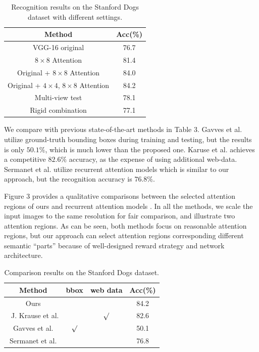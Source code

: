 \documentclass[10pt,twocolumn,letterpaper]{article}
\begin{document}
\begin{table}[htb]
\begin{center}
\begin{tabular}
{c|c}\hline
Method &   Acc(\%) \\\hline\hline
VGG-16 original  & 76.7 \\
$8\times8$ Attention  & 81.4 \\
Original + $8\times8$ Attention & 84.0 \\
Original + $4\times4$, $8\times8$ Attention & 84.2 \\
Multi-view test  & 78.1 \\
Rigid combination & 77.1 \\\hline
\end{tabular}
\caption{Recognition results on the Stanford Dogs dataset with different settings.}
\end{center}
\end{table}

We compare with previous state-of-the-art methods in Table 3.
Gavves et al. \cite{bd13} utilize ground-truth bounding boxes during training and testing, but the results is only $50.1\%$, which is much lower than the proposed one.
Karuse et al. \cite{bd21} achieves a competitive $82.6\%$ accuracy, as the expense of using additional web-data.
Sermanet et al. \cite{bd3} utilize recurrent attention models which is similar to our approach, but the recognition accuracy is $76.8\%$.

Figure 3 provides a qualitative comparisons between the selected attention regions of ours and recurrent attention models \cite{bd3}.
In all the methods, we scale the input images to the same resolution for fair comparison, and illustrate two attention regions.
As can be seen, both methods focus on reasonable attention regions, but our approach can select attention regions corresponding different semantic ``parts'' because of well-designed reward strategy and network architecture.


\begin{table}[htb]
\begin{center}
\begin{tabular}
{c||c|c|c}\hline
Method &  bbox & web data & Acc(\%) \\\hline\hline
Ours &  & & 84.2 \\\
J. Krause et al. \cite{bd21} &  & $\surd$ & 82.6 \\
Gavves et al. \cite{bd13} & $\surd$ &  & 50.1 \\
Sermanet et al. \cite{bd3}  &  & & 76.8  \\\hline
\end{tabular}
\caption{Comparison results on the Stanford Dogs dataset.}
\end{center}
\end{table}
\end{document}
